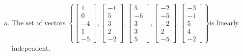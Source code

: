 \begin{exerciseAnswer}
\begin{enumerate}[(a)]
\item  The set of vectors \( \left\{ \left[\begin{array}{c}
1 \\
0 \\
-4 \\
1 \\
-5
\end{array}\right] , \left[\begin{array}{c}
-1 \\
5 \\
3 \\
2 \\
-2
\end{array}\right] , \left[\begin{array}{c}
5 \\
-6 \\
3 \\
3 \\
5
\end{array}\right] , \left[\begin{array}{c}
-2 \\
-5 \\
-2 \\
2 \\
-5
\end{array}\right] , \left[\begin{array}{c}
-3 \\
-1 \\
5 \\
4 \\
-2
\end{array}\right] \right\} \)is linearly independent.
\end{enumerate}
    
\end{exerciseAnswer}
    

